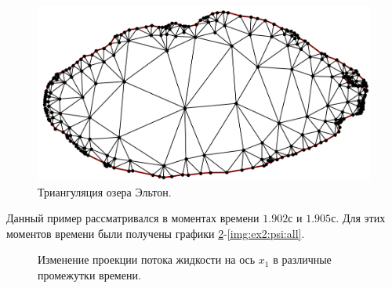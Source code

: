 \documentclass[14pt]{extreport}
\begin{document}
\begin{figure}[H]
\centerline{
\includegraphics[width=1.0\linewidth]{images/ex2/mesh}}
\caption{Триангуляция озера Эльтон.}
\label{img:ex2:mesh}
\end{figure}

Данный пример рассматривался в моментах времени $1.902$с и $1.905$с. Для этих моментов времени были получены графики \ref{img:ex2:q1:all}-\ref{img:ex2:psi:all}.

\begin{figure}[H]
  \centering
  \hfill
  \caption{Изменение проекции потока жидкости на ось $x_1$ в различные промежутки времени.}
  \label{img:ex2:q1:all}
\end{figure}
\end{document}
